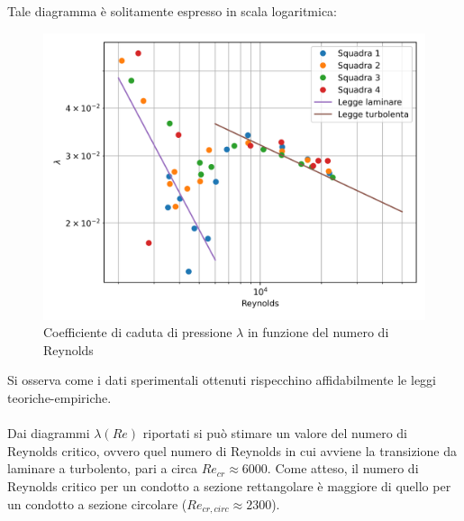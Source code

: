 \noindent Tale diagramma è solitamente espresso in scala logaritmica:
\begin{figure}[H]
    \centering
    \includegraphics[width=.92\textwidth]{images/7/lambdaloglog.png}
    \caption{Coefficiente di caduta di pressione $\lambda$ in funzione del numero di Reynolds}
\end{figure}

\noindent Si osserva come i dati sperimentali ottenuti rispecchino affidabilmente le leggi teoriche-empiriche.\\\\
Dai diagrammi $\lambda(Re)$ riportati si può stimare un valore del numero di Reynolds critico, ovvero quel numero di Reynolds in cui avviene la transizione da laminare a turbolento, pari a circa $Re_{cr}\approx6000$. Come atteso, il numero di Reynolds critico per un condotto a sezione rettangolare è maggiore di quello per un condotto a sezione circolare ($Re_{cr,circ}\approx 2300$).